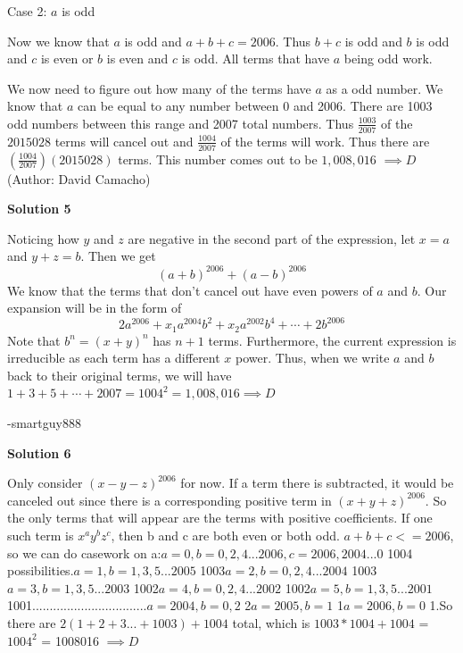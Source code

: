 \begin{enumerate}
 Case 2:    $a$ is odd

 Now we know that $a$ is odd and $a+b+c=2006$. Thus $b+c$ is odd and $b$ is odd and $c$ is even or $b$ is even and $c$ is odd. All terms that have $a$ being odd work.

 We now need to figure out how many of the terms have $a$ as a odd number. We know that $a$ can be equal to any number between 0 and 2006. There are 1003 odd numbers between this range and 2007 total numbers. Thus $\frac{1003}{2007}$ of the $2015028$ terms will cancel out and  $\frac{1004}{2007}$ of the terms will work. Thus there are $(\frac{1004}{2007})(2015028)$ terms. This number comes out to be $1,008,016$ $\implies \boxed{D}$(Author: David Camacho)

 



\textbf{Solution 5}

Noticing how $y$ and $z$ are negative in the second part of the expression, let $x=a$ and $y+z = b$. Then we get 
 \[(a+b)^{2006} + (a-b)^{2006}\]We know that the terms that don't cancel out have even powers of $a$ and $b$. Our expansion will be in the form of
 \[2a^{2006} + x_1a^{2004}b^{2} + x_2a^{2002}b^{4} + \cdots + 2b^{2006}\]Note that $b^n = (x+y)^n$ has $n+1$ terms. Furthermore, the current expression is irreducible as each term has a different $x$ power. Thus, when we write $a$ and $b$ back to their original terms, we will have $1+3+5+ \cdots + 2007 = 1004^2 = 1,008,016 \implies \boxed{D}$

 -smartguy888

 



\textbf{Solution 6}

Only consider $(x-y-z)^{2006}$ for now. If a term there is subtracted, it would be canceled out since there is a corresponding positive term in $(x+y+z)^{2006}$. So the only terms that will appear are the terms with positive coefficients. If one such term is $x^{a}y^{b}z^{c}$, then b and c are both even or both odd. $a + b + c <= 2006$, so we can do casework on a:$a = 0, b = 0, 2, 4... 2006, c = 2006, 2004...0$ 1004 possibilities.$a = 1, b = 1, 3, 5... 2005$ 1003$a = 2, b = 0, 2, 4... 2004$ 1003$a = 3, b = 1, 3, 5... 2003$ 1002$a = 4, b = 0, 2, 4... 2002$ 1002$a = 5, b = 1, 3, 5... 2001$ 1001.................................$a = 2004, b = 0, 2$ 2$a = 2005, b = 1$ 1$a = 2006, b = 0$ 1.So there are $2(1+2+3...+1003) + 1004$ total, which is $1003*1004 + 1004$ = $1004^2$ = 1008016 $\implies \boxed{D}$





\end{enumerate}
